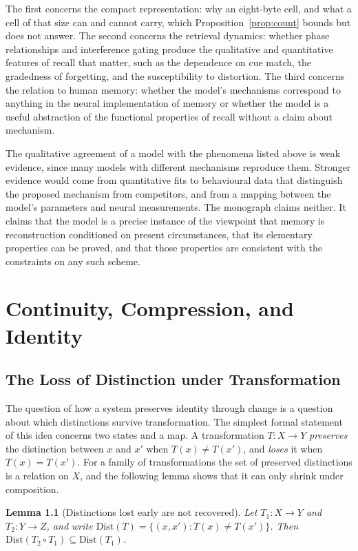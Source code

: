 \documentclass[11pt,twoside,openright]{book}
\theoremstyle{plain}
\newtheorem{lemma}[theorem]{Lemma}
\theoremstyle{definition}
\theoremstyle{remark}
\begin{document}
The first concerns the compact representation: why an eight-byte cell, and what a cell of that size can and cannot carry, which Proposition~\ref{prop:count} bounds but does not answer. The second concerns the retrieval dynamics: whether phase relationships and interference gating produce the qualitative and quantitative features of recall that matter, such as the dependence on cue match, the gradedness of forgetting, and the susceptibility to distortion. The third concerns the relation to human memory: whether the model's mechanisms correspond to anything in the neural implementation of memory or whether the model is a useful abstraction of the functional properties of recall without a claim about mechanism.

The qualitative agreement of a model with the phenomena listed above is weak evidence, since many models with different mechanisms reproduce them. Stronger evidence would come from quantitative fits to behavioural data that distinguish the proposed mechanism from competitors, and from a mapping between the model's parameters and neural measurements. The monograph claims neither. It claims that the model is a precise instance of the viewpoint that memory is reconstruction conditioned on present circumstances, that its elementary properties can be proved, and that those properties are consistent with the constraints on any such scheme.

\chapter{Continuity, Compression, and Identity}
\label{ch:cont}

\section{The Loss of Distinction under Transformation}

The question of how a system preserves identity through change is a question about which distinctions survive transformation. The simplest formal statement of this idea concerns two states and a map. A transformation $T:X\to Y$ \emph{preserves} the distinction between $x$ and $x'$ when $T(x)\neq T(x')$, and \emph{loses} it when $T(x)=T(x')$. For a family of transformations the set of preserved distinctions is a relation on $X$, and the following lemma shows that it can only shrink under composition.

\begin{lemma}[Distinctions lost early are not recovered]\label{lem:loss}
Let $T_1:X\to Y$ and $T_2:Y\to Z$, and write $\mathrm{Dist}(T)=\{(x,x'):T(x)\neq T(x')\}$. Then $\mathrm{Dist}(T_2\circ T_1)\subseteq\mathrm{Dist}(T_1)$.
\end{lemma}
\end{document}
